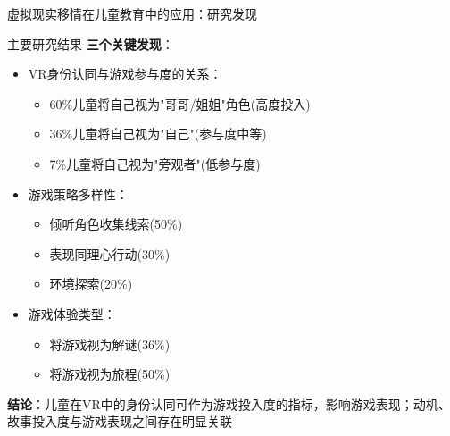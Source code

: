 \documentclass[aspectratio=169,xcolor=dvipsnames]{beamer}
\begin{document}
\begin{frame}{虚拟现实移情在儿童教育中的应用：研究发现}
    \begin{block}{主要研究结果}
        \textbf{三个关键发现}：
        \begin{itemize}
            \item VR身份认同与游戏参与度的关系：
                \begin{itemize}
                    \item 60\%儿童将自己视为"哥哥/姐姐"角色(高度投入)
                    \item 36\%儿童将自己视为"自己"(参与度中等)
                    \item 7\%儿童将自己视为"旁观者"(低参与度)
                \end{itemize}
            
            \item 游戏策略多样性：
                \begin{itemize}
                    \item 倾听角色收集线索(50\%)
                    \item 表现同理心行动(30\%)
                    \item 环境探索(20\%)
                \end{itemize}
                
            \item 游戏体验类型：
                \begin{itemize}
                    \item 将游戏视为解谜(36\%)
                    \item 将游戏视为旅程(50\%)
                \end{itemize}
        \end{itemize}
        
        \textbf{结论}：儿童在VR中的身份认同可作为游戏投入度的指标，影响游戏表现；动机、故事投入度与游戏表现之间存在明显关联
    \end{block}
\end{frame}
\end{document}

